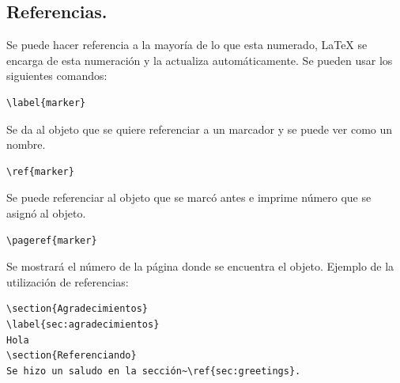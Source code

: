 \documentclass[10pt,journal,compsoc]{IEEEtran}
\begin{document}
\subsection{Referencias.}
Se puede hacer referencia a la mayor\'ia de lo que esta numerado, LaTeX se encarga de esta numeraci\'on y la actualiza autom\'aticamente.
\newline Se pueden usar los siguientes comandos:
\begin{lstlisting}
\label{marker}
\end{lstlisting}
Se da al objeto que se quiere referenciar a un marcador y se puede ver como un nombre.
\begin{lstlisting}
\ref{marker}
\end{lstlisting}
Se puede referenciar al objeto que se marc\'o antes e imprime n\'umero que se asign\'o al objeto.
\begin{lstlisting}
\pageref{marker}
\end{lstlisting}
Se mostrar\'a el n\'umero de la p\'agina donde se encuentra el objeto.
\newline 
Ejemplo de la utilizaci\'on de referencias:
\begin{lstlisting}
\section{Agradecimientos}
\label{sec:agradecimientos}
Hola
\section{Referenciando}
Se hizo un saludo en la sección~\ref{sec:greetings}.
\end{lstlisting}
\end{document}
